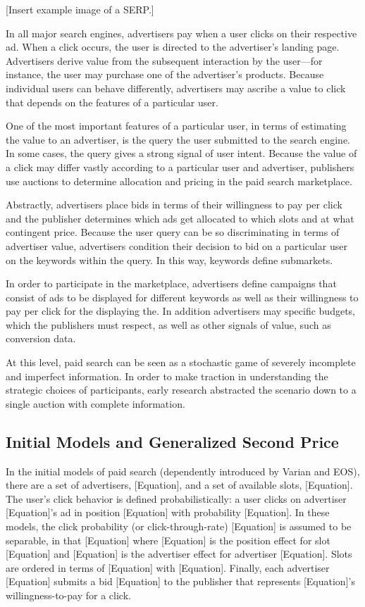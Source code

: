 \documentclass[prodmode,acmtist]{acmsmall} %
\begin{document}
[Insert example image of a SERP.] 

In all major search engines, advertisers pay when a user clicks on their respective ad.  
When a click occurs, the user is directed to the advertiser’s landing page.  
Advertisers derive value from the subsequent interaction by the user---for instance, the user may purchase one of the advertiser’s products.  
Because individual users can behave differently, advertisers may ascribe a value to click that depends on the features of a particular user. 

One of the most important features of a particular user, in terms of estimating the value to an advertiser, is the query the user submitted to the search engine.  
In some cases, the query gives a strong signal of user intent.  
Because the value of a click may differ vastly according to a particular user and advertiser, publishers use auctions to determine allocation and pricing in the paid search marketplace. 

Abstractly, advertisers place bids in terms of their willingness to pay per click and the publisher determines which ads get allocated to which slots and at what contingent price.  
Because the user query can be so discriminating in terms of advertiser value, advertisers condition their decision to bid on a particular user on the keywords within the query.  
In this way, keywords define submarkets. 

In order to participate in the marketplace, advertisers define campaigns that consist of ads to be displayed for different keywords as well as their willingness to pay per click for the displaying the.  
In addition advertisers may specific budgets, which the publishers must respect, as well as other signals of value, such as conversion data. 

At this level, paid search can be seen as a stochastic game of severely incomplete and imperfect information.  
In order to make traction in understanding the strategic choices of participants, early research abstracted the scenario down to a single auction with complete information. 

\subsection{Initial Models and Generalized Second Price} %
\label{sub:initial_models_and_generalized_second_price}

In the initial models of paid search (dependently introduced by Varian and EOS), there are a set of advertisers, [Equation], and a set of available slots, [Equation].  
The user’s click behavior is defined probabilistically: a user clicks on advertiser [Equation]’s ad in position [Equation] with probability [Equation].  
In these models, the click probability (or click-through-rate) [Equation] is assumed to be separable, in that  [Equation] where [Equation] is the position effect for slot [Equation] and [Equation] is the advertiser effect for advertiser [Equation].  
Slots are ordered in terms of [Equation] with [Equation].    
Finally, each advertiser [Equation] submits a bid [Equation] to the publisher that represents [Equation]’s willingness-to-pay for a click. 
\end{document}
